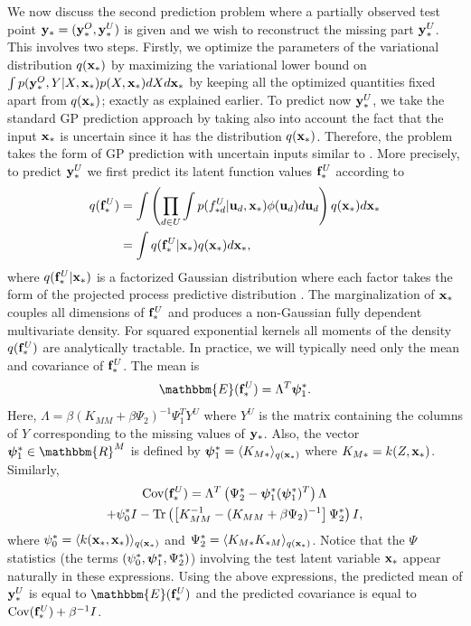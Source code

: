 \documentclass[twoside,times]{article}
\begin{document}
We now discuss the second prediction problem where a partially 
observed test point $\mathbf{y}_* = (\mathbf{y}_*^O,\mathbf{y}_*^U)$ is given and 
we wish to reconstruct the missing part $\mathbf{y}_*^U$. This involves two
steps. Firstly, we optimize the parameters of the variational
distribution $q(\mathbf{x}_*)$  by maximizing the variational lower 
bound on  $\int p(\mathbf{y}_*^O,Y | X, \mathbf{x}_*) p(X,\mathbf{x}_*) d X d
\mathbf{x}_*$ by keeping all the optimized quantities fixed apart 
from $q(\mathbf{x}_*)$; exactly as explained earlier. To predict now $\mathbf{y}_*^U$,
we take the standard GP prediction approach by taking also into
account the fact that the input $\mathbf{x}_*$ is uncertain
since it has the distribution $q(\mathbf{x}_*)$. Therefore, 
the problem takes the form of GP prediction with uncertain inputs similar 
to \cite{Girard:uncertain01}. More precisely, to  predict 
$\mathbf{y}_*^U$ we first predict its latent function values $\mathbf{f}_*^U$
according to 
\begin{align}
q(\mathbf{f}_*^U) & = 
\int   \left( \prod_{d \in U} \int p(f_{*d}^U | \mathbf{u}_d, \mathbf{x}_*) 
\phi(\mathbf{u}_d) d \mathbf{u}_d \right) q(\mathbf{x}_*) d \mathbf{x}_* \nonumber \\ 
& = \int q(\mathbf{f}_{*}^U|\mathbf{x}_*)  q(\mathbf{x}_*) d \mathbf{x}_*, 
\end{align}  
where $q(\mathbf{f}_{*}^U|\mathbf{x}_*)$ is a factorized Gaussian distribution
where each factor takes the form of the projected process predictive 
distribution \citep{Csato:sparse02,Seeger:fast03,Rasmussen:book06}. 
The marginalization of $\mathbf{x}_*$ couples all dimensions of
$\mathbf{f}_*^U$ and produces a non-Gaussian fully dependent
multivariate density. For squared exponential kernels 
all moments of the density $q(\mathbf{f}_{*}^U )$ are analytically tractable. 
In practice, we will typically need only the mean and covariance 
of $\mathbf{f}_{*}^U$. The mean is
\begin{equation}
\mathbbm{E}(\bff_{*}^U) = \Lambda^T  \bfpsi_{1}^*. \nonumber  
\label{eq:meanPredLatentF} 
\end{equation} 
Here, $\Lambda = \beta (K_{MM} + \beta \Psi_2)^{-1}
\Psi_1^T Y^U$ where $Y^U$ is the matrix containing the
columns of $Y$ corresponding to the missing values of $\mathbf{y}_*$. Also,  
the vector $\bfpsi_{1}^* \in \mathbbm{R}^M$ is defined by 
$\boldsymbol{\psi}_{1}^* = \langle K_{M*} \rangle_{q(\mathbf{x}_*)}$
where $ K_{M*} =  k(Z,\mathbf{x}_*)$. Similarly,
\begin{multline}
\text{Cov}(\mathbf{f}_{*}^U) 
 = \Lambda^T \left( \Psi_2^* -  \boldsymbol{\psi}_1^* (\boldsymbol{\psi}_1^*)^T \right)
 \Lambda \nonumber \\ 
+ \psi_{0}^* I  - \text{Tr} \left(   
\left[ K_{MM}^{-1} - (K_{MM} + \beta \Psi_2)^{-1} 
\right] \Psi_2^* \right) I,
\label{eq:varPredLatentF} 
\end{multline}    
where $\psi_0^* = \langle k(\mathbf{x}_*,\mathbf{x}_*) \rangle_{q(\mathbf{x}_*)}$ 
and $\Psi_2^*  = \langle K_{M *} K_{* M} \rangle_{q(\mathbf{x}_*)}$. Notice
that the $\Psi$ statistics (the terms $(\psi_0^*,\boldsymbol{\psi}_1^*,\Psi_2^*)$)
involving the test latent variable $\mathbf{x}_*$ 
appear naturally in these expressions. Using the above expressions,
the predicted mean of $\mathbf{y}_{*}^U$ is equal to $\mathbbm{E}(\bff_{*}^U)$ and the
predicted covariance is equal to $\text{Cov}(\mathbf{f}_{*}^U) + \beta^{-1} I$. 
  
\end{document}
